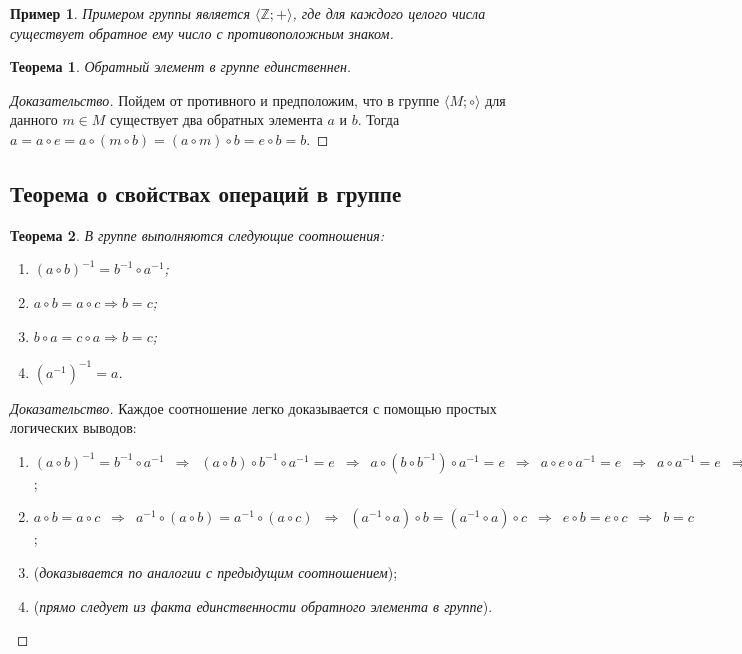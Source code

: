 \documentclass{article}
\newtheorem*{theorem*}{Теорема}
\theoremstyle{plain}
\newtheorem*{example*}{Пример}
\theoremstyle{definition}
\begin{document}
\begin{example*}
	Примером группы является \(\langle \mathbb{Z}; + \rangle\), где для каждого целого числа существует обратное ему число с противоположным знаком.
\end{example*}

\begin{theorem*}
	Обратный элемент в группе единственнен.
\end{theorem*}

\begin{proof}[Доказательство]
	Пойдем от противного и предположим, что в группе \(\langle M; \circ \rangle\) для данного \(m \in M\) существует два обратных элемента \(a\) и \(b\). Тогда \(a = a \circ e = a \circ (m \circ b) = (a \circ m) \circ b = e \circ b = b\).
\end{proof}

\subsection{Теорема о свойствах операций в группе}

\begin{theorem*}
	В группе выполняются следующие соотношения:

	\begin{enumerate}
		\item \((a \circ b)^{-1} = b^{-1} \circ a^{-1}\);
		\item \(a \circ b = a \circ c \Rightarrow b = c\);
		\item \(b \circ a = c \circ a \Rightarrow b = c\);
		\item \((a^{-1})^{-1} = a\).  
	\end{enumerate}
\end{theorem*}

\begin{proof}[Доказательство]
	Каждое соотношение легко доказывается с помощью простых логических выводов:

	\begin{enumerate}
		\item \(
			(a \circ b)^{-1} = b^{-1} \circ a^{-1} \enspace \Rightarrow \enspace
			(a \circ b) \circ b^{-1} \circ a^{-1} {= e} \enspace \Rightarrow \enspace
			a \circ (b \circ b^{-1}) \circ a^{-1} {= e} \enspace \Rightarrow \enspace
			a \circ e \circ a^{-1} {= e} \enspace \Rightarrow \enspace
			a \circ a^{-1} {= e} \enspace \Rightarrow \enspace
			e = e
		\);

		\item \(
			a \circ b = a \circ c \enspace \Rightarrow \enspace
			a^{-1} \circ (a \circ b) = a^{-1} \circ (a \circ c) \enspace \Rightarrow \enspace
			(a^{-1} \circ a) \circ b = (a^{-1} \circ a) \circ c \enspace \Rightarrow \enspace
			e \circ b = e \circ c \enspace \Rightarrow \enspace
			b = c
		\);

		\item (\textit{доказывается по аналогии с предыдущим соотношением});

		\item (\textit{прямо следует из факта единственности обратного элемента в группе}).
	\end{enumerate}
\end{proof}
\end{document}
